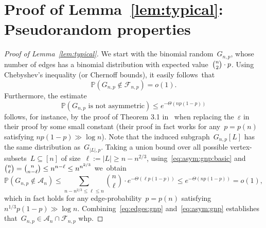 \documentclass{article}
\newcommand{\eps}{\varepsilon}
\renewcommand{\Pr}{\mathbb{P}}
\newcommand{\cA}{\mathcal{A}}
\newcommand{\cF}{\mathcal{F}}
\newcommand{\refL}[1]{Lemma~\ref{#1}}
\begin{document}
\section{Proof of \refL{lem:typical}: Pseudorandom properties}\label{apx:pseudorandom}
\begin{proof}[Proof of \refL{lem:typical}]
We start with the binomial random~$G_{n,p}$, 
whose number of edges has a binomial distribution with expected value~$\tbinom{n}{2} \cdot p$. 
Using Chebyshev's inequality (or Chernoff bounds),
it easily follows~that 
\begin{equation}\label{eq:edges:gnp}
\Pr(G_{n,p} \not\in \cF_{n,p}) 
= o(1). 
\end{equation}
Furthermore, the estimate 
\begin{equation}\label{eq:asym:gnp:basic}
\Pr(G_{n,p} \text{ is not asymmetric}) \le e^{-\Theta(np(1-p))} 
\end{equation}
follows, for instance, by the proof of Theorem 3.1 in~\cite{kim2002asymmetry} when replacing the~$\eps$ in their proof by some small constant (their proof in fact works for any~$p=p(n)$ satisfying $np(1-p) \gg \log n$).  Note that the induced subgraph~$G_{n,p}[L]$ has the same distribution as~$G_{|L|,p}$. 
Taking a union bound over all possible vertex-subsets~$L \subseteq [n]$ of size~$\ell := |L| \ge n-n^{2/3}$,   
using~\eqref{eq:asym:gnp:basic} and~$\tbinom{n}{\ell}=\tbinom{n}{n-\ell} \le n^{n-\ell} \le n^{n^{2/3}}$ we~obtain 
\begin{equation}\label{eq:asym:gnp}
\Pr(G_{n,p} \not\in \cA_n) \le \sum_{n-n^{2/3} \le \ell \le n} \binom{n}{\ell}  \cdot e^{-\Theta(\ell p(1-p))} \le e^{-\Theta(np(1-p))} = o(1), 
\end{equation}
which in fact holds for any edge-probability~$p=p(n)$ satisfying $n^{1/3}p(1-p) \gg \log n$. 
Combining~\eqref{eq:edges:gnp} and~\eqref{eq:asym:gnp} establishes that~$G_{n,p}\in \cA_n \cap \cF_{n,p}$ whp. 


\end{proof}
\end{document}
